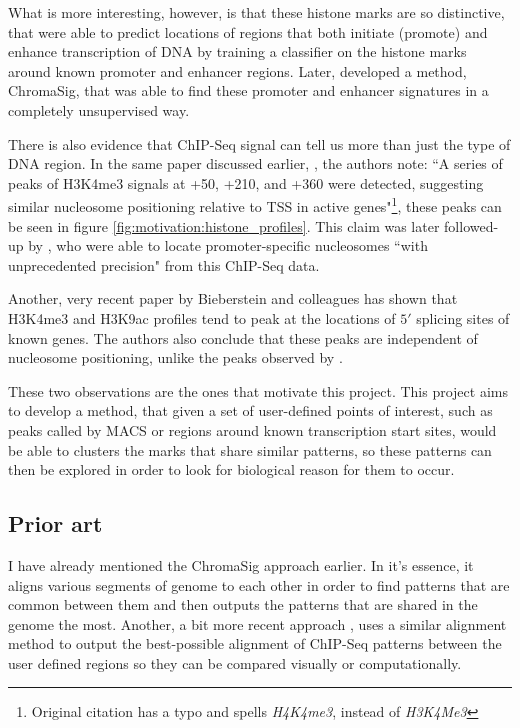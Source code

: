 \documentclass[parskip]{cs4rep}
\newcommand{\histonemodification}[1]{#1}
\begin{document}
What is more interesting, however, is that these histone marks are so distinctive, that 
\cite{Heintzman:2007ke} were able to predict locations of regions that both initiate (promote) and enhance transcription of DNA by training a classifier on the histone marks around known promoter and enhancer regions. Later, \cite{Hon:2008wv} developed a method, ChromaSig, that was able to find these promoter and enhancer signatures in a completely unsupervised way.

There is also evidence that ChIP-Seq signal can tell us more than just the type of DNA region. In the same paper discussed earlier, \cite{Barski:2007ww}, the authors note: ``A series of peaks of H3K4me3 signals at +50, +210, and +360 were detected, suggesting similar nucleosome positioning relative to TSS in active genes"\footnote{Original citation has a typo and spells \emph{H4K4me3}, instead of \emph{H3K4Me3}}, these peaks can be seen in figure \autoref{fig:motivation:histone_profiles}. 
This claim was later followed-up by \cite{Schmid:2007ue}, who were able to locate promoter-specific nucleosomes ``with unprecedented precision" from this ChIP-Seq data. 

Another, very recent paper by Bieberstein and colleagues\cite{Bieberstein:2012tf} has shown that \histonemodification{H3K4me3} and \histonemodification{H3K9ac} profiles tend to peak at the locations of $5'$ splicing sites of known genes. The authors also conclude that these peaks are independent of nucleosome positioning, unlike the peaks observed by \cite{Barski:2007ww}.

These two observations are the ones that motivate this project. This project aims to develop a method, that given a set of user-defined points of interest, such as peaks called by MACS or regions around known transcription start sites, would be able to clusters the marks that share similar patterns, so these patterns can then be explored in order to look for biological reason for them to occur.

\subsection{Prior art}

I have already mentioned the ChromaSig\cite{Hon:2008wv} approach earlier. In it's essence, it aligns various segments of genome to each other in order to find patterns that are common between them and then outputs the patterns that are shared in the genome the most. Another, a bit more recent approach \cite{Lai:2010ue}, uses a similar alignment method to output the best-possible alignment of ChIP-Seq patterns between the user defined regions so they can be compared visually or computationally.
\end{document}

